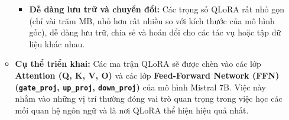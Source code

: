 \begin{itemize}
\begin{itemize}
\begin{itemize}
            \item \textbf{Dễ dàng lưu trữ và chuyển đổi:} Các trọng số QLoRA rất nhỏ gọn (chỉ vài trăm MB, nhỏ hơn rất nhiều so với kích thước của mô hình gốc), dễ dàng lưu trữ, chia sẻ và hoán đổi cho các tác vụ hoặc tập dữ liệu khác nhau.
        \end{itemize}
        \item \textbf{Cụ thể triển khai:} Các ma trận QLoRA sẽ được chèn vào các lớp \textbf{Attention (Q, K, V, O)} và các lớp \textbf{Feed-Forward Network (FFN) (\texttt{gate\_proj}, \texttt{up\_proj}, \texttt{down\_proj})} của mô hình Mistral 7B. Việc này nhắm vào những vị trí thường đóng vai trò quan trọng trong việc học các mối quan hệ ngôn ngữ và là nơi QLoRA thể hiện hiệu quả nhất.
    \end{itemize}
\end{itemize}


